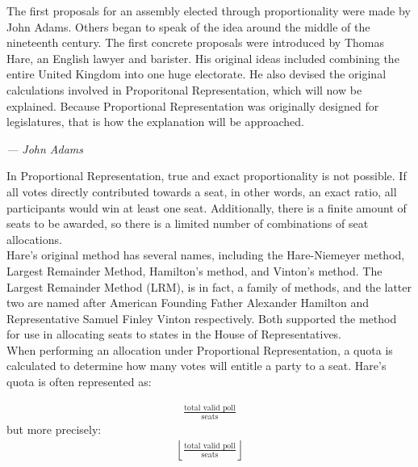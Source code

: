 \documentclass{article}
\begin{document}
    The first proposals for an assembly elected through proportionality were made by John Adams. Others began to speak of the idea around the middle of the nineteenth century. The first concrete proposals were introduced by Thomas Hare, an English lawyer and barister. His original ideas included combining the entire United Kingdom into one huge electorate. He also devised the original calculations involved in Proporitonal Representation, which will now be explained. Because Proportional Representation was originally designed for legislatures, that is how the explanation will be approached. \\

    \begin{flushright}\textit{--- John Adams}\end{flushright}%

    In Proportional Representation, true and exact proportionality is not possible. If all votes directly contributed towards a seat, in other words, an exact ratio, all participants would win at least one seat. Additionally, there is a finite amount of seats to be awarded, so there is a limited number of combinations of seat allocations. \\

    Hare's original method has several names, including the Hare-Niemeyer method, Largest Remainder Method, Hamilton's method, and Vinton's method. The Largest Remainder Method (LRM), is in fact, a family of methods, and the latter two are named after American Founding Father Alexander Hamilton and Representative Samuel Finley Vinton respectively. Both supported the method for use in allocating seats to states in the House of Representatives. \\

    When performing an allocation under Proportional Representation, a quota is calculated to determine how many votes will entitle a party to a seat. Hare's quota is often represented as:%

    \begin{align}
        \frac{\text{total valid poll}}{\text{seats}}
    \end{align}
    but more precisely:%
    \begin{align}
        \left \lfloor \frac{\text{total valid poll}}{\text{seats}} \right \rfloor
    \end{align}
\end{document}
